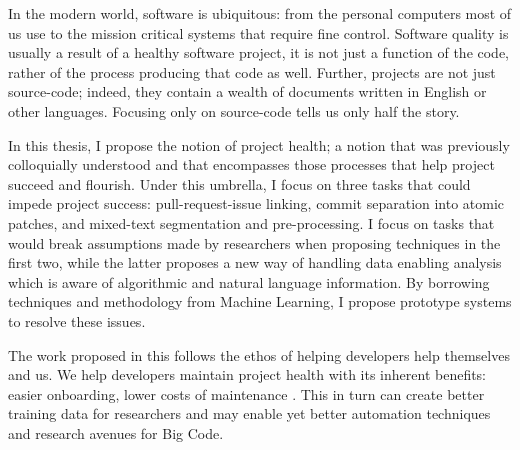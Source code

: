 \begin{impactstatement}
In the modern world, software is ubiquitous: from the personal computers most of
us use to the mission critical systems that require fine control. Software
quality is usually a result of a healthy software project, \ie it is not just a
function of the code, rather of the process producing that code as well.
Further, projects are not just source-code; indeed, they contain a wealth of
documents written in English or other languages. Focusing only on source-code
tells us only half the story.

In this thesis, I propose the notion of project health; a notion that was
previously colloquially understood and that encompasses those processes that
help project succeed and flourish. Under this umbrella, I focus on three tasks
that could impede project success: pull-request-issue linking, commit separation
into atomic patches, and mixed-text segmentation and pre-processing. I focus on
tasks that would break assumptions made by researchers when proposing techniques
in the first two, while the latter proposes a new way of handling data enabling
analysis which is aware of algorithmic and natural language information. By
borrowing techniques and methodology from Machine Learning, I propose prototype
systems to resolve these issues.

The work proposed in this follows the ethos of helping developers help
themselves and us. We help developers maintain project health with its inherent
benefits: easier onboarding, lower costs of maintenance \etc. This in turn can
create better training data for researchers and may enable yet better automation
techniques and research avenues for Big Code.
\end{impactstatement}

